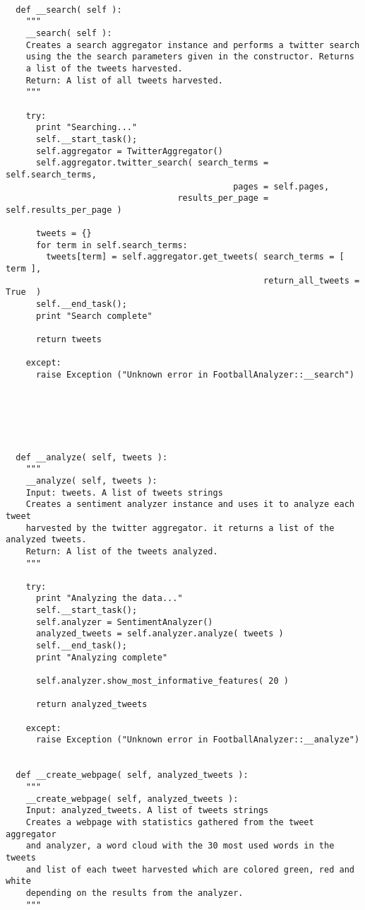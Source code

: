 \begin{verbatim}
  
  def __search( self ):
    """
    __search( self ):
    Creates a search aggregator instance and performs a twitter search 
    using the the search parameters given in the constructor. Returns 
    a list of the tweets harvested.
    Return: A list of all tweets harvested.
    """
    
    try:
      print "Searching..."
      self.__start_task();
      self.aggregator = TwitterAggregator()
      self.aggregator.twitter_search( search_terms = self.search_terms, 
                                             pages = self.pages, 
                                  results_per_page = self.results_per_page )
      
      tweets = {} 
      for term in self.search_terms:
        tweets[term] = self.aggregator.get_tweets( search_terms = [ term ], 
                                                   return_all_tweets = True  )
      self.__end_task();
      print "Search complete"
      
      return tweets
    
    except:
      raise Exception ("Unknown error in FootballAnalyzer::__search")






  def __analyze( self, tweets ):
    """
    __analyze( self, tweets ):
    Input: tweets. A list of tweets strings
    Creates a sentiment analyzer instance and uses it to analyze each tweet 
    harvested by the twitter aggregator. it returns a list of the analyzed tweets.
    Return: A list of the tweets analyzed. 
    """
    
    try:
      print "Analyzing the data..."
      self.__start_task();
      self.analyzer = SentimentAnalyzer()
      analyzed_tweets = self.analyzer.analyze( tweets )
      self.__end_task();
      print "Analyzing complete"
      
      self.analyzer.show_most_informative_features( 20 )
      
      return analyzed_tweets
    
    except:
      raise Exception ("Unknown error in FootballAnalyzer::__analyze")
  
  
  def __create_webpage( self, analyzed_tweets ):
    """
    __create_webpage( self, analyzed_tweets ):
    Input: analyzed_tweets. A list of tweets strings
    Creates a webpage with statistics gathered from the tweet aggregator 
    and analyzer, a word cloud with the 30 most used words in the tweets
    and list of each tweet harvested which are colored green, red and white 
    depending on the results from the analyzer.
    """
    

\end{verbatim}
